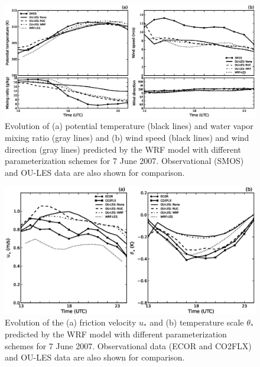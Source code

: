 \begin{figure}[H]
\begin{center}
\includegraphics[width=\textwidth]{figures/chapter6/meteogram_20070607}
\end{center}
\caption{Evolution of (a) potential temperature (black lines) and water vapor mixing ratio (gray lines) and (b) wind speed (black lines) and wind direction (gray lines) predicted by the WRF model with different parameterization schemes for 7 June 2007. Observational (SMOS) and OU-LES data are also shown for comparison.}
\label{figure601}
\end{figure}



\begin{figure}[H]
\begin{center}
\includegraphics[width=\textwidth]{figures/chapter6/ust_tst_20070607}
\end{center}
\caption{Evolution of the (a) friction velocity $u_*$ and (b) temperature scale $\theta_*$ predicted by the WRF model with different parameterization schemes for 7 June 2007. Observational data (ECOR and CO2FLX) and OU-LES data are also shown for comparison.}
\label{figure602}
\end{figure}


